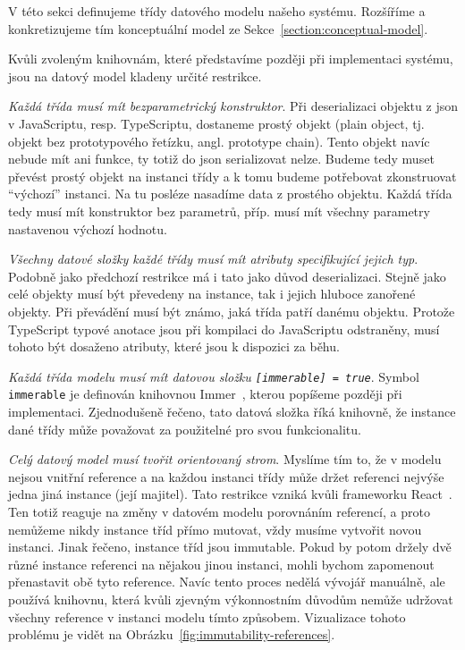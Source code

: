 V této sekci definujeme třídy datového modelu našeho systému.
Rozšíříme a konkretizujeme tím konceptuální model ze Sekce~\ref{section:conceptual-model}.

Kvůli zvoleným knihovnám, které představíme později při implementaci systému, jsou na datový model kladeny určité restrikce.

\emph{Každá třída musí mít bezparametrický konstruktor}.
Při deserializaci objektu z \acrshort{json} v JavaScriptu, resp. TypeScriptu, dostaneme prostý objekt (plain object, tj. objekt bez prototypového řetízku, angl. prototype chain).
Tento objekt navíc nebude mít ani funkce, ty totiž do \acrshort{json} serializovat nelze.
Budeme tedy muset převést prostý objekt na instanci třídy a k tomu budeme potřebovat zkonstruovat \enquote{výchozí} instanci.
Na tu posléze nasadíme data z prostého objektu.
Každá třída tedy musí mít konstruktor bez parametrů, příp. musí mít všechny parametry nastavenou výchozí hodnotu.

\emph{Všechny datové složky každé třídy musí mít atributy specifikující jejich typ}.
Podobně jako předchozí restrikce má i tato jako důvod deserializaci.
Stejně jako celé objekty musí být převedeny na instance, tak i jejich hluboce zanořené objekty.
Při převádění musí být známo, jaká třída patří danému objektu.
Protože TypeScript typové anotace jsou při kompilaci do JavaScriptu odstraněny, musí tohoto být dosaženo atributy, které jsou k dispozici za běhu.

\emph{Každá třída modelu musí mít datovou složku \texttt{[immerable] = true}}.
Symbol \texttt{immerable} je definován knihovnou Immer~\cite{michelweststrate_immer_2023}, kterou popíšeme později při implementaci.
Zjednodušeně řečeno, tato datová složka říká knihovně, že instance dané třídy může považovat za použitelné pro svou funkcionalitu.

\emph{Celý datový model musí tvořit orientovaný strom}.
Myslíme tím to, že v modelu nejsou vnitřní reference a na každou instanci třídy může držet referenci nejvýše jedna jiná instance (její majitel).
Tato restrikce vzniká kvůli frameworku React~\cite{react_2023}.
Ten totiž reaguje na změny v datovém modelu porovnáním referencí, a proto nemůžeme nikdy instance tříd přímo mutovat, vždy musíme vytvořit novou instanci.
Jinak řečeno, instance tříd jsou immutable.
Pokud by potom držely dvě různé instance referenci na nějakou jinou instanci, mohli bychom zapomenout přenastavit obě tyto reference.
Navíc tento proces nedělá vývojář manuálně, ale používá knihovnu, která kvůli zjevným výkonnostním důvodům nemůže udržovat všechny reference v instanci modelu tímto způsobem.
Vizualizace tohoto problému je vidět na Obrázku~\ref{fig:immutability-references}.

